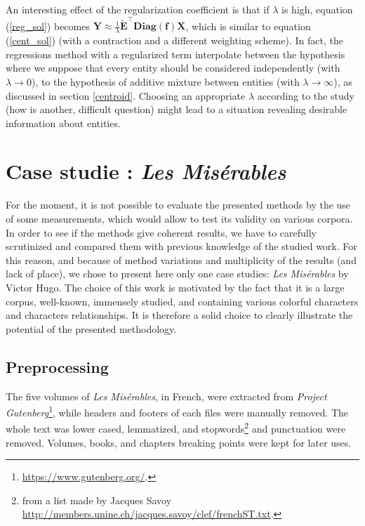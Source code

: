 \documentclass[
twocolumn,
]{ceurart}
\begin{document}
An interesting effect of the regularization coefficient is that if $\lambda$ is high, equation (\ref{reg_sol}) becomes $\mathbf{Y} \approx \frac{1}{\lambda} \widetilde{\mathbf{E}}^\top \textbf{Diag}(\mathbf{f}) \mathbf{X}$, which is similar to equation (\ref{cent_sol}) (with a contraction and a different weighting scheme). In fact, the regressions method with a regularized term interpolate between the hypothesis where we suppose that every entity should be considered independently (with $\lambda \to 0$), to the hypothesis of additive mixture between entities (with $\lambda \to \infty$), as discussed in section \ref{centroid}. Choosing an appropriate $\lambda$ according to the study (how is another, difficult question) might lead to a situation revealing desirable information about entities.

\section{Case studie : \emph{Les Misérables}}
\label{case_studie}

For the moment, it is not possible to evaluate the presented methods by the use of some measurements, which would allow to test its validity on various corpora. In order to see if the methods give coherent results, we have to carefully scrutinized and compared them with previous knowledge of the studied work. For this reason, and because of method variations and multiplicity of the results (and lack of place), we chose to present here only one case studies: \emph{Les Misérables} by Victor Hugo. The choice of this work is motivated by the fact that it is a large corpus, well-known, immensely studied, and containing various colorful characters and characters relationships. It is therefore a solid choice to clearly illustrate the potential of the presented methodology.

\subsection{Preprocessing}

The five volumes of \emph{Les Misérables}, in French, were extracted from \emph{Project Gutenberg}\footnote{\url{https://www.gutenberg.org/}.}, while headers and footers of each files were manually removed. The whole text was lower cased, lemmatized, and stopwords\footnote{from a list made by Jacques Savoy \url{http://members.unine.ch/jacques.savoy/clef/frenchST.txt}.} and punctuation were removed. Volumes, books, and chapters breaking points were kept for later uses. 
\end{document}

